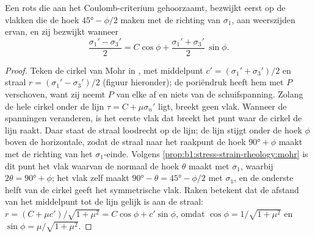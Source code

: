\begin{theorem}[De bezwijkhoek]\label{thm:b1:stress-strain-rheology:failure-angle}
Een rots die aan het Coulomb-criterium gehoorzaamt, bezwijkt eerst op de vlakken die de hoek $\ang{45} - \phi/2$ maken met de richting van $\sigma_1$, aan weerszijden ervan, en zij bezwijkt wanneer
\[
  \frac{\sigma_1' - \sigma_3'}{2} = C\cos\phi + \frac{\sigma_1' + \sigma_3'}{2}\,\sin\phi .
\]
\end{theorem}

\begin{proof}
Teken de cirkel van Mohr in , met middelpunt $c' =
(\sigma_1'+\sigma_3')/2$ en straal $r = (\sigma_1'-\sigma_3')/2$
(figuur hieronder); de poriëndruk heeft hem met $P$ verschoven, want zij neemt $P$ van elke  af en niets van de schuifspanning. Zolang de hele cirkel onder de lijn $\tau = C + \mu\sigma_n'$ ligt,
breekt geen vlak. Wanneer de spanningen veranderen, is het eerste vlak dat breekt het punt waar de cirkel de lijn raakt. Daar staat de straal loodrecht op de lijn; de lijn stijgt onder de hoek $\phi$ boven de horizontale, zodat de straal naar het raakpunt de hoek $\ang{90} + \phi$ maakt met de richting van het $\sigma_1$-einde. Volgens \cref{prop:b1:stress-strain-rheology:mohr} is dit punt het vlak waarvan de normaal de hoek $\theta$ maakt met $\sigma_1$, waarbij $2\theta = \ang{90} + \phi$; het vlak zelf maakt $\ang{90} - \theta = \ang{45} - \phi/2$ met $\sigma_1$, en de onderste helft van de cirkel geeft het symmetrische vlak. Raken betekent dat de afstand van het middelpunt tot de lijn gelijk is aan de straal: $r = (C + \mu c')/\sqrt{1+\mu^2} = C\cos\phi + c'\sin\phi$, omdat $\cos\phi = 1/\sqrt{1+\mu^2}$ en $\sin\phi = \mu/\sqrt{1+\mu^2}$.
\end{proof}

